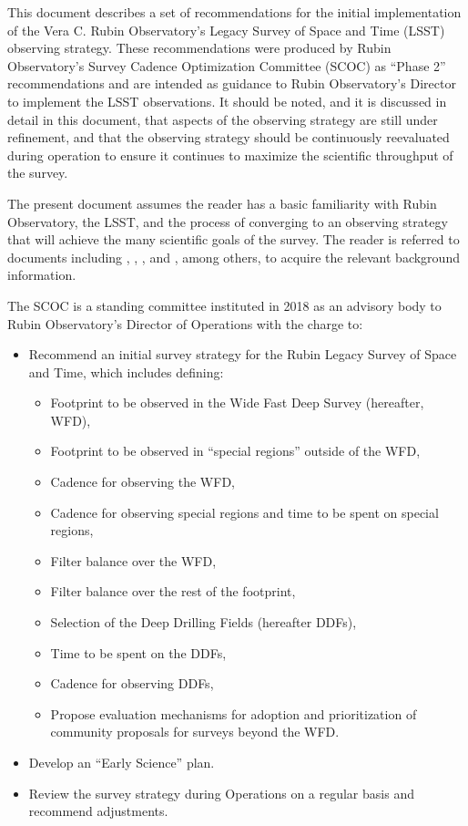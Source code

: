 This document describes a set of recommendations for the initial implementation of the Vera C. Rubin Observatory's Legacy Survey of Space and Time (LSST) observing strategy. These recommendations were produced by Rubin Observatory's Survey Cadence Optimization Committee (SCOC) as ``Phase 2'' recommendations and are intended as guidance to Rubin Observatory's Director to implement the LSST observations. It should be noted, and it is discussed in detail in this document, that aspects of the observing strategy are still under refinement, and that the observing strategy should be continuously reevaluated during operation to ensure it continues to maximize the scientific throughput of the survey.

The present document assumes the reader has a basic familiarity with Rubin Observatory, the LSST, and the process of converging to an observing strategy that will achieve the many scientific goals of the survey. The reader is referred to documents including , , , and \citet{2022ApJS..258....1B}, among others, to acquire the relevant background information. 

The SCOC is a standing committee instituted in 2018 as an advisory body to Rubin Observatory's Director of Operations with the charge to:
\begin{itemize}
\item Recommend an initial survey strategy for the Rubin Legacy Survey of Space and Time, which includes defining:
\begin{itemize}
\item Footprint to be observed in the Wide Fast Deep Survey (hereafter, WFD),
\item Footprint to be observed in ``special regions'' outside of the WFD,
\item Cadence for observing the WFD,
\item Cadence for observing special regions and time to be spent on special regions,
\item Filter balance over the WFD,
\item Filter balance over the rest of the footprint,
\item Selection of the Deep Drilling Fields (hereafter DDFs),
\item Time to be spent on the DDFs,
\item Cadence for observing DDFs,
\item Propose evaluation mechanisms for adoption and prioritization of community proposals for surveys beyond the WFD.
\end{itemize}
\item Develop an ``Early Science'' plan.
\item Review the survey strategy during Operations on a regular basis and recommend adjustments.
\end{itemize}

